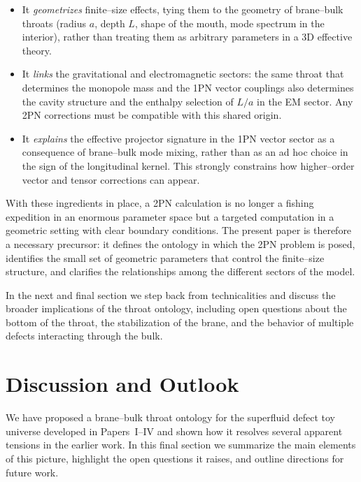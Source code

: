 \documentclass[12pt]{article}
\begin{document}
\begin{itemize}
  \item It \emph{geometrizes} finite--size effects, tying them to the
        geometry of brane--bulk throats (radius $a$, depth $L$, shape of the
        mouth, mode spectrum in the interior), rather than treating them as
        arbitrary parameters in a 3D effective theory.

  \item It \emph{links} the gravitational and electromagnetic sectors:
        the same throat that determines the monopole mass and the 1PN vector
        couplings also determines the cavity structure and the enthalpy
        selection of $L/a$ in the EM sector.  Any 2PN corrections must be
        compatible with this shared origin.

  \item It \emph{explains} the effective projector signature in the 1PN
        vector sector as a consequence of brane--bulk mode mixing, rather
        than as an ad hoc choice in the sign of the longitudinal kernel.
        This strongly constrains how higher--order vector and tensor
        corrections can appear.
\end{itemize}

With these ingredients in place, a 2PN calculation is no longer a fishing
expedition in an enormous parameter space but a targeted computation in a
geometric setting with clear boundary conditions.  The present paper is
therefore a necessary precursor: it defines the ontology in which the 2PN
problem is posed, identifies the small set of geometric parameters that
control the finite--size structure, and clarifies the relationships among
the different sectors of the model.

In the next and final section we step back from technicalities and discuss
the broader implications of the throat ontology, including open questions
about the bottom of the throat, the stabilization of the brane, and the
behavior of multiple defects interacting through the bulk.

\section{Discussion and Outlook}
\label{sec:discussion_outlook}

We have proposed a brane--bulk throat ontology for the superfluid defect toy
universe developed in Papers~I--IV and shown how it resolves several
apparent tensions in the earlier work.  In this final section we summarize
the main elements of this picture, highlight the open questions it raises,
and outline directions for future work.
\end{document}

